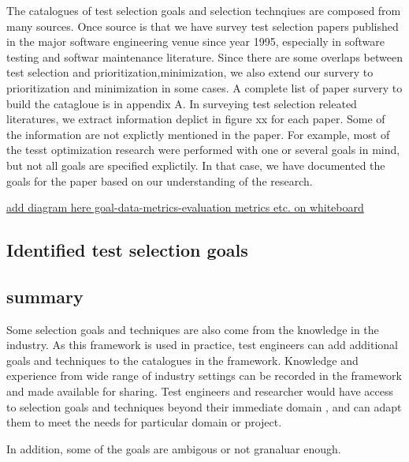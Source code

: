 The catalogues of test selection goals and selection technqiues are composed
from many sources. Once source is  that we have survey test selection papers
published in the major software engineering venue since year 1995, especially in
software testing and softwar maintenance literature. Since there are some
overlaps between test selection and prioritization,minimization, we also extend our survery to prioritization and minimization in some cases. A
complete list of paper survery to build the catagloue is in appendix A.
In surveying test selection releated literatures, we extract information deplict
in figure xx for each paper. Some of the information are not explictly mentioned
in the paper. For example,  most of the tesst optimization research were
performed with one or several goals in mind, but not all goals are specified
explictily. In that case, we have documented the goals for the paper  based on
our understanding of the research. 

\underline{add diagram here goal-data-metrics-evaluation metrics etc. on
whiteboard}
\subsection{Identified test selection goals}


\subsection{summary}
Some selection goals and techniques are also come from the knowledge in the
industry. As this framework is used in practice, test engineers can add
additional goals and techniques to the catalogues in the framework. Knowledge
and experience from wide range of industry settings can be recorded in the
framework and made available for sharing. Test engineers and researcher would
have access to selection goals and techniques beyond their immediate domain ,
and can adapt them to meet the needs for particular domain or project.




In addition, some of the goals are ambigous or not granaluar enough. 



%
%

